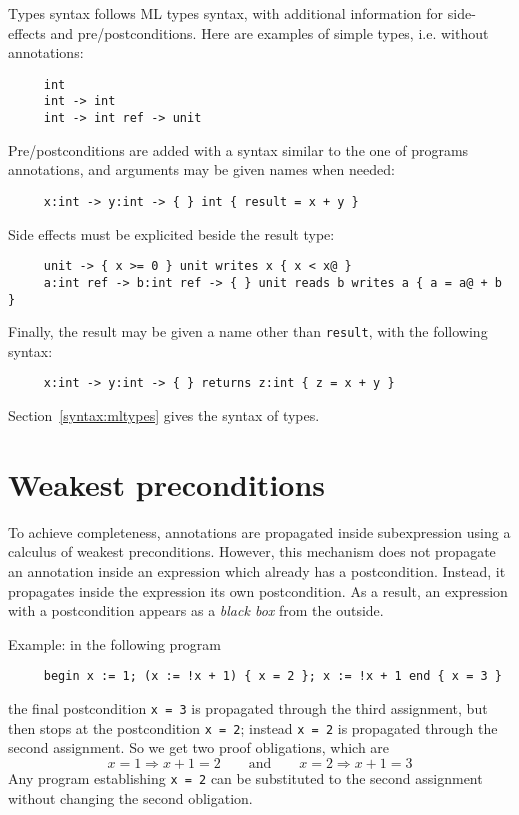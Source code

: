 \documentclass[a4paper,12pt]{report}
\begin{document}
Types syntax follows ML types syntax, with additional information for
side-effects and pre/postconditions. Here are examples of simple types,
i.e. without annotations:
\begin{verbatim}
     int
     int -> int
     int -> int ref -> unit
\end{verbatim}
Pre/postconditions are added with a syntax similar to the one of
programs annotations, and arguments may be given names when needed:
\begin{verbatim}
     x:int -> y:int -> { } int { result = x + y }
\end{verbatim}
Side effects must be explicited beside the result type:
\begin{verbatim}
     unit -> { x >= 0 } unit writes x { x < x@ }
     a:int ref -> b:int ref -> { } unit reads b writes a { a = a@ + b }
\end{verbatim}
Finally, the result may be given a name other than \texttt{result},
with the following syntax:
\begin{verbatim}
     x:int -> y:int -> { } returns z:int { z = x + y }
\end{verbatim}
Section~\ref{syntax:mltypes} gives the syntax of types.


\section{Weakest preconditions}
\label{wp}
To achieve completeness, annotations are propagated inside
subexpression using a calculus of weakest preconditions.
However, this mechanism does not propagate an annotation inside an
expression which already has a postcondition. Instead, it propagates
inside the expression its own postcondition. As a result, an
expression with a postcondition appears as a \emph{black box} from the
outside. 

Example: in the following program
\begin{verbatim}
     begin x := 1; (x := !x + 1) { x = 2 }; x := !x + 1 end { x = 3 }
\end{verbatim}
the final postcondition \texttt{x = 3} is propagated through the third
assignment, but then stops at the postcondition \texttt{x = 2};
instead \texttt{x = 2} is propagated through the second
assignment. So we get two proof obligations, which are
\begin{displaymath}
  x=1 \Rightarrow x+1=2 
  \qquad\mbox{and}\qquad
  x=2 \Rightarrow x+1=3
\end{displaymath}
Any program establishing \texttt{x = 2} can be substituted to the
second assignment without changing the second obligation.
\end{document}
